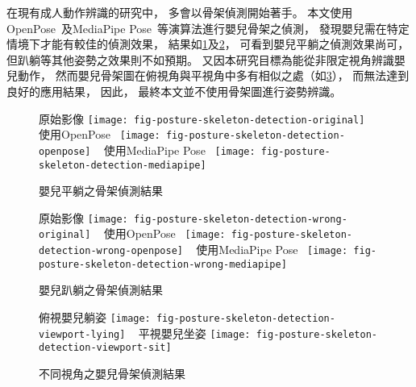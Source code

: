 \documentclass[class=NCU_thesis, crop=false]{standalone}
\begin{document}
在現有成人動作辨識的研究中，
多會以骨架偵測開始著手。
本文使用OpenPose~\cite{cao_openpose_2019}及MediaPipe Pose~\cite{noauthor_pose_nodate}等演算法進行嬰兒骨架之偵測，
發現嬰兒需在特定情境下才能有較佳的偵測效果，
結果如\cref{fig:fig-posture-skeleton-detection}及\cref{fig:fig-posture-skeleton-detection-wrong}，
可看到嬰兒平躺之偵測效果尚可，
但趴躺等其他姿勢之效果則不如預期。
又因本研究目標為能從非限定視角辨識嬰兒動作，
然而嬰兒骨架圖在俯視角與平視角中多有相似之處（如\cref{fig:fig-posture-skeleton-detection-viewport}），
而無法達到良好的應用結果，
因此，
最終本文並不使用骨架圖進行姿勢辨識。
\begin{figure}[!hbt]
    \centering
    \subcaptionbox
        {原始影像
        \label{fig:fig-posture-skeleton-detection-original}}
        {\texttt{[image: fig-posture-skeleton-detection-original]}}
    ~
    \subcaptionbox
        {使用OpenPose~\cite{cao_openpose_2019}
        \label{fig:fig-posture-skeleton-detection-openpose}}
        {\texttt{[image: fig-posture-skeleton-detection-openpose]}}
    ~
    \subcaptionbox
        {使用MediaPipe Pose~\cite{noauthor_pose_nodate}
        \label{fig:fig-posture-skeleton-detection-mediapipe}}
        {\texttt{[image: fig-posture-skeleton-detection-mediapipe]}}
    \caption{嬰兒平躺之骨架偵測結果}
    \label{fig:fig-posture-skeleton-detection}
\end{figure}
\begin{figure}[!hbt]
    \centering
    \subcaptionbox
        {原始影像
        \label{fig:fig-posture-skeleton-detection-wrong-original}}
        {\texttt{[image: fig-posture-skeleton-detection-wrong-original]}}
    ~
    \subcaptionbox
        {使用OpenPose~\cite{cao_openpose_2019}
        \label{fig:fig-posture-skeleton-detection-wrong-openpose}}
        {\texttt{[image: fig-posture-skeleton-detection-wrong-openpose]}}
    ~
    \subcaptionbox
        {使用MediaPipe Pose~\cite{noauthor_pose_nodate}
        \label{fig:fig-posture-skeleton-detection-wrong-mediapipe}}
        {\texttt{[image: fig-posture-skeleton-detection-wrong-mediapipe]}}
    \caption{嬰兒趴躺之骨架偵測結果}
    \label{fig:fig-posture-skeleton-detection-wrong}
\end{figure}
\begin{figure}[!hbt]
    \centering
    \subcaptionbox
        {俯視嬰兒躺姿
        \label{fig:fig-posture-skeleton-detection-viewport-lying}}
        {\texttt{[image: fig-posture-skeleton-detection-viewport-lying]}}
    ~
    \subcaptionbox
        {平視嬰兒坐姿
        \label{fig:fig-posture-skeleton-detection-viewport-sit}}
        {\texttt{[image: fig-posture-skeleton-detection-viewport-sit]}}
    \caption{不同視角之嬰兒骨架偵測結果}
    \label{fig:fig-posture-skeleton-detection-viewport}
\end{figure}
\end{document}
